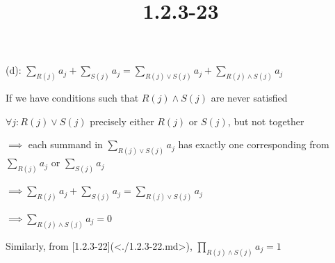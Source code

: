 \documentclass{article}
\title{1.2.3-23}
\begin{document}
\maketitle

(d): \( \sum_{R(j)} a_j + \sum_{S(j)} a_j = \sum_{R(j) \lor S(j)} a_j + \sum_{R(j) \land S(j)} a_j \)

If we have conditions such that \( R(j) \land S(j) \) are never satisfied

\( \forall j: R(j) \lor S(j) \) precisely either \( R(j) \) or \( S(j) \), but not together

\( \implies \) each summand in \( \sum_{R(j) \lor S(j)} a_j \) has exactly one corresponding from \( \sum_{R(j)} a_j \) or \( \sum_{S(j)} a_j \)

\( \implies \sum_{R(j)} a_j + \sum_{S(j)} a_j = \sum_{R(j) \lor S(j)} a_j \)

\( \implies \sum_{R(j) \land S(j)} a_j = 0 \)

Similarly, from [1.2.3-22](<./1.2.3-22.md>), \( \prod_{R(j) \land S(j)} a_j = 1 \)
\end{document}
